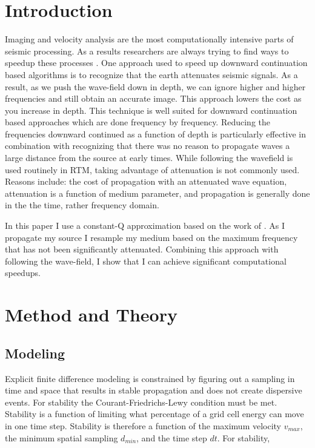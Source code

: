 \documentclass{paris17}
\begin{document}
\section{Introduction}

Imaging and velocity analysis are the most computationally intensive parts of seismic processing. As a results researchers are always trying to find ways to speedup these processes \cite[]{bednar,Stork}.  One approach used to speed up downward continuation based algorithms is to recognize that the earth attenuates seismic signals.  As a result, as we push the wave-field down in depth, we can ignore higher and higher frequencies and still obtain an accurate image\cite[]{Clapp.sep.111.bob3}.  This approach lowers the cost as you increase in depth. This technique is well suited for downward continuation based approaches which are done frequency by frequency.  Reducing the frequencies downward continued as a function of depth  is particularly effective in combination with recognizing that there was no reason to propagate waves a large distance from the source at early times.  While following the wavefield is used routinely in RTM,  taking advantage of attenuation is not commonly used.  Reasons include: the cost of propagation with an attenuated wave equation, attenuation is a function of medium parameter, and propagation is generally done in the the time, rather frequency domain.

In this paper I use a constant-Q approximation based on the work of \cite[]{zhu}.  As I propagate my source I resample my medium based on the maximum frequency that has not been significantly attenuated. Combining this approach with following the wave-field, I show that I can achieve significant computational speedups.

\section{Method and Theory}

\subsection{Modeling}

Explicit finite difference modeling is constrained by figuring  out a sampling in time and space that results in stable propagation and does not create dispersive events.  For stability the Courant-Friedrichs-Lewy condition \cite[]{courant1967partial} must be met.  Stability is a function of limiting what percentage of a grid cell energy can move in one time step. Stability is therefore a function of the maximum velocity $v_{max}$, the minimum spatial sampling $d_{min}$, and the time step $dt$. For stability,
\end{document}
